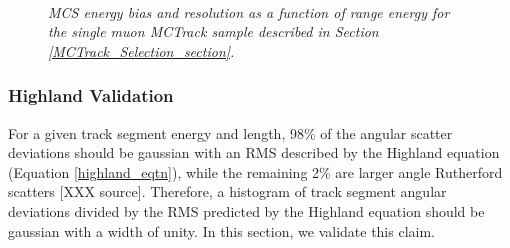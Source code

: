 \begin{figure}
\centering
\mbox{
	\quad
	}
\caption{\textit{MCS energy bias and resolution as a function of range energy for the single muon {\sc MCTrack} sample described in Section \ref{MCTrack_Selection_section}.}}
\label{MCS_range_bias_resolution_MCTrack_fig}
\end{figure}



\subsubsection{Highland Validation}\label{Highland_Validation_MCTrack_section}
For a given track segment energy and length, 98\% of the angular scatter deviations should be gaussian with an RMS described by the Highland equation (Equation \ref{highland_eqtn}), while the remaining 2\% are larger angle Rutherford scatters [XXX source]. Therefore, a histogram of track segment angular deviations divided by the RMS predicted by the Highland equation should be gaussian with a width of unity. In this section, we validate this claim.\\

